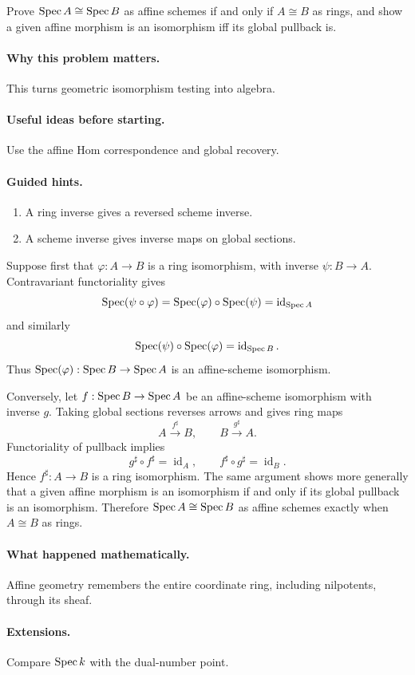 \begin{problem}\label{prob:vi19-p11}
Prove $\operatorname{Spec} A\cong\operatorname{Spec} B$ as affine schemes if and only if $A\cong B$ as rings, and show a given affine morphism is an isomorphism iff its global pullback is.
\end{problem}

\ifdefined\FullProblemDossiers
\paragraph{Why this problem matters.}
This turns geometric isomorphism testing into algebra.

\paragraph{Useful ideas before starting.}
Use the affine Hom correspondence and global recovery.

\paragraph{Guided hints.}
\begin{enumerate}
\item A ring inverse gives a reversed scheme inverse.
\item A scheme inverse gives inverse maps on global sections.
\end{enumerate}

\begin{solution}
Suppose first that \(\varphi:A\to B\) is a ring isomorphism, with inverse \(\psi:B\to A\).  Contravariant functoriality gives
\[
\operatorname{Spec}(\psi\circ\varphi)=\operatorname{Spec}(\varphi)\circ\operatorname{Spec}(\psi)=\operatorname{id}_{\operatorname{Spec} A}
\]
and similarly
\[
\operatorname{Spec}(\psi)\circ\operatorname{Spec}(\varphi)=\operatorname{id}_{\operatorname{Spec} B}.
\]
Thus \(\operatorname{Spec}(\varphi):\operatorname{Spec} B\to\operatorname{Spec} A\) is an affine-scheme isomorphism.

Conversely, let \(f:\operatorname{Spec} B\to\operatorname{Spec} A\) be an affine-scheme isomorphism with inverse \(g\).  Taking global sections reverses arrows and gives ring maps
\[
A\xrightarrow{f^\sharp}B,
\qquad
B\xrightarrow{g^\sharp}A.
\]
Functoriality of pullback implies
\[
g^\sharp\circ f^\sharp=\operatorname{id}_A,
\qquad
f^\sharp\circ g^\sharp=\operatorname{id}_B.
\]
Hence \(f^\sharp:A\to B\) is a ring isomorphism.  The same argument shows more generally that a given affine morphism is an isomorphism if and only if its global pullback is an isomorphism.  Therefore \(\operatorname{Spec} A\cong\operatorname{Spec} B\) as affine schemes exactly when \(A\cong B\) as rings.
\end{solution}

\paragraph{What happened mathematically.}
Affine geometry remembers the entire coordinate ring, including nilpotents, through its sheaf.

\paragraph{Extensions.}
Compare $\operatorname{Spec} k$ with the dual-number point.
\fi
